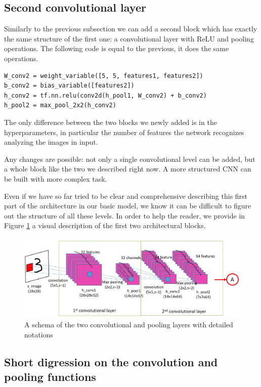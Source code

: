 \subsection{Second convolutional layer}

Similarly to the previous subsection we can add a second block which has exactly the same structure of the first one: a convolutional layer with ReLU and pooling operations. The following code is equal to the previous, it does the same operations.

\begin{lstlisting}
W_conv2 = weight_variable([5, 5, features1, features2])
b_conv2 = bias_variable([features2])
h_conv2 = tf.nn.relu(conv2d(h_pool1, W_conv2) + b_conv2)
h_pool2 = max_pool_2x2(h_conv2)
\end{lstlisting}

The only difference between the two blocks we newly added is in the hyperparameters, in particular the number of features the network recognizes analyzing the images in input.

Any changes are possible: not only a single convolutional level can be added, but a whole block like the two we described right now. A more structured \acs{CNN} can be built with more complex task.

Even if we have so far tried to be clear and comprehensive describing this first part of the architecture in our basic model, we know it can be difficult to figure out the structure of all these levels. In order to help the reader, we provide in Figure \ref{fig:conv_layers} a visual description of the first two architectural blocks.

\begin{figure}
	\caption{A schema of the two convolutional and pooling layers with detailed notations}
	\label{fig:conv_layers}
	\centering
	\includegraphics[width=1\textwidth]{Images/conv_layers}
\end{figure}

\subsection{Short digression on the convolution and pooling functions}

